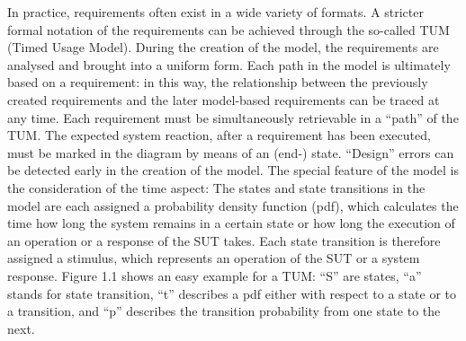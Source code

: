 In practice, requirements often exist in a wide variety of formats.
A stricter formal notation of the requirements can be achieved through
the so-called TUM (Timed Usage Model). During the creation of the
model, the requirements are analysed and brought into a uniform form.
Each path in the model is ultimately based on a requirement: in this
way, the relationship between the previously created requirements
and the later model-based requirements can be traced at any time.
Each requirement must be simultaneously retrievable in a \enquote{path}
of the TUM. The expected system reaction, after a requirement has
been executed, must be marked in the diagram by means of an (end-)
state. \enquote{Design} errors can be detected early
in the creation of the model. The special feature of the model is
the consideration of the time aspect: The states and state transitions
in the model are each assigned a probability density function (pdf),
which calculates the time how long the system remains in a certain
state or how long the execution of an operation or a response of the
SUT takes. Each state transition is therefore assigned a stimulus,
which represents an operation of the SUT or a system response. Figure
1.1 shows an easy example for a TUM: \enquote{S}
are states, \enquote{a} stands for state transition,
\enquote{t} describes a pdf either with respect
to a state or to a transition, and \enquote{p} describes
the transition probability from one state to the next.

